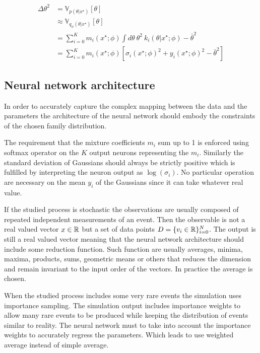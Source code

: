 \begin{align}
    \Delta\theta^2 & = \mathbb V_{p(\theta | x^\star)}[\theta] \\
    & \approx \mathbb V_{q_\phi(\theta | x^\star)}[\theta] \\
    & = \sum_{i=0}^K m_i(x^\star ; \phi) \int d\theta ~ \theta^2 ~ k_i(\theta | x^\star ; \phi) - \bar \theta^2 \\
    & = \sum_{i=0}^K m_i(x^\star ; \phi) \left [ \sigma_i(x^\star ; \phi)^2 + y_i(x^\star ; \phi)^2 - \bar \theta^2 \right ]
\end{align}

\subsection{Neural network architecture}

In order to accurately capture the complex mapping between the data and the parameters the architecture of the neural network should embody the constraints of the chosen family distribution.

The requirement that the mixture coefficients $m_i$ sum up to 1 is enforced using softmax operator on the $K$ output neurons representing the $m_i$.
Similarly the standard deviation of Gaussians should always be strictly positive which is fulfilled by interpreting the neuron output as $\log(\sigma_i)$.
No particular operation are necessary on the mean $y_i$ of the Gaussians since it can take whatever real value.

If the studied process is stochastic the observations are usually composed of repeated independent measurements of an event.
Then the observable is not a real valued vector $x \in \mathbb{R}$ but a set of data points $D = \{v_i \in \mathbb{R} \}_{i=0}^N$.
The output is still a real valued vector meaning that the neural network architecture should include some reduction function.
Such function are usually averages, minima, maxima, products, sums, geometric means or others that reduces the dimension and remain invariant to the input order of the vectors.
In practice the average is chosen.

When the studied process includes some very rare events the simulation uses importance sampling. 
The simulation output includes importance weights to allow many rare events to be produced while keeping the distribution of events similar to reality.
The neural network must to take into account the importance weights to accurately regress the parameters.
Which leads to use weighted average instead of simple average.

